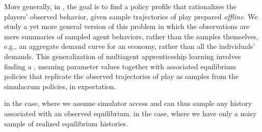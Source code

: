 
More generally, in
 \citep{abbeel2004apprenticeship, yang2020inferring}, the goal is to find a policy profile that rationalizes the players' observed behavior, given sample trajectories of play prepared \emph{offline}.
We study a yet more general version of this problem in which the observations are mere summaries of sampled agent behaviors, rather than the samples themselves, e.g., an aggregate demand curve for an economy, rather than all the individuals' demands.
This generalization of multiagent apprenticeship learning involves finding a , meaning parameter values together with associated equilibrium policies that replicate the observed trajectories of play as samples from the simulacrum policies, in expectation.



in the  case, where we assume simulator access and can thus sample any history associated with an observed equilibrium.
in the  case, where we have only a noisy sample of realized equilibrium histories. 
\fi

